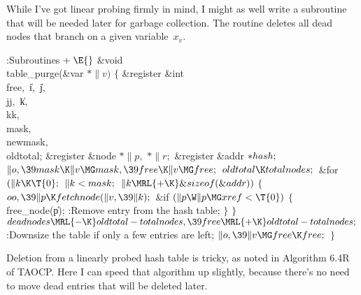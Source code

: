 While I've got linear probing firmly in mind, I might as
well
write a subroutine that will be needed later for garbage collection.
The  routine deletes all dead nodes that branch
on a given variable~$x_v$.

\Y\B\4:Subroutines\X${}\mathrel+\E{}$\6
\&{void} \\{table\_purge}(\&{var} ${}{*}\|v){}$\1\1\2\2\6
${}\{{}$\1\6
\&{register} \&{int} \\{free}${},{}$ \|i${},{}$ \|j${},{}$ \\{jj}${},{}$ %
\|k${},{}$ \\{kk}${},{}$ \\{mask}${},{}$ \\{newmask}${},{}$ \\{oldtotal};\6
\&{register} \&{node} ${}{*}\|p,{}$ ${}{*}\|r;{}$\6
\&{register} \&{addr} ${}{*}\\{hash};{}$\7
${}\|o,\39\\{mask}\K\|v\MG\\{mask},\39\\{free}\K\|v\MG\\{free};{}$\6
${}\\{oldtotal}\K\\{totalnodes};{}$\6
\&{for} ${}(\|k\K\T{0};{}$ ${}\|k<\\{mask};{}$ ${}\|k\MRL{+{\K}}\&{sizeof}(%
\&{addr})){}$\5
${}\{{}$\1\6
${}\\{oo},\39\|p\K\\{fetchnode}(\|v,\39\|k);{}$\6
\&{if} ${}(\|p\W\|p\MG\\{xref}<\T{0}){}$\5
${}\{{}$\1\6
\\{free\_node}(\|p);\6
:Remove entry  from the hash table\X;\6
\4${}\}{}$\2\6
\4${}\}{}$\2\6
${}\\{deadnodes}\MRL{-{\K}}\\{oldtotal}-\\{totalnodes},\39\\{free}\MRL{+{\K}}%
\\{oldtotal}-\\{totalnodes};{}$\6
:Downsize the table if only a few entries are left\X;\6
${}\|o,\39\|v\MG\\{free}\K\\{free};{}$\6
\4${}\}{}$\2\par
\fi

Deletion from a linearly probed hash table is tricky, as
noted in
Algorithm 6.4R of TAOCP. Here I can speed that algorithm up slightly,
because there's no need to move dead entries that will be deleted later.

